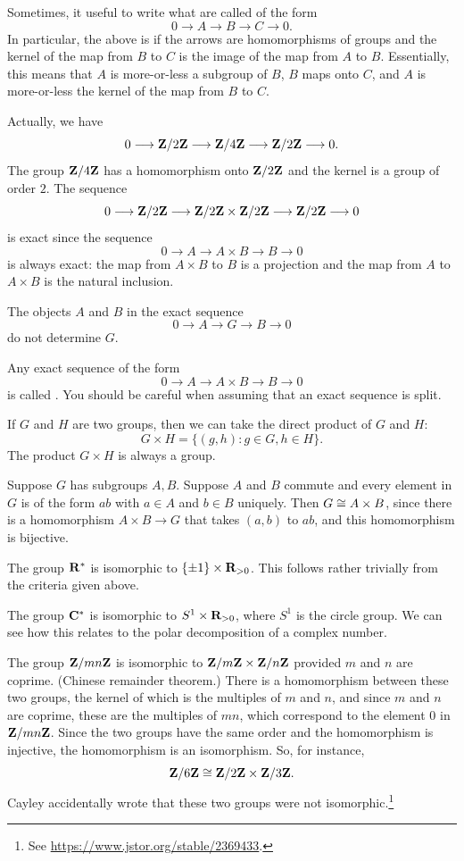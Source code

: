 \documentclass[11pt, twoside]{amsart}
\begin{document}
Sometimes, it useful to write what are called {} of the form
$$
0\longrightarrow A \longrightarrow B\longrightarrow C\longrightarrow 0.
$$
In particular, the above is  if the arrows are homomorphisms of groups and the kernel of the map from $B$ to $C$ is the image of the map from $A$ to $B$. Essentially, this means that $A$ is more-or-less a subgroup of $B$, $B$ maps onto $C$, and $A$ is more-or-less the kernel of the map from $B$ to $C$. 

Actually, we have
$$
0\longrightarrow\mathbf{Z}/2\mathbf{Z} \longrightarrow \mathbf{Z}/4\mathbf{Z} \longrightarrow \mathbf{Z}/2\mathbf{Z} \longrightarrow 0.
$$
The group $\mathbf{Z}/4\mathbf{Z}$ has a homomorphism onto $\mathbf{Z}/2\mathbf{Z}$ and the kernel is a group of order $2$. The sequence
$$
0\longrightarrow\mathbf{Z}/2\mathbf{Z} \longrightarrow \mathbf{Z}/2\mathbf{Z} \times \mathbf{Z}/2\mathbf{Z}\longrightarrow \mathbf{Z}/2\mathbf{Z} \longrightarrow 0
$$
is exact since the sequence 
$$
0\longrightarrow A\longrightarrow A\times B \longrightarrow B\longrightarrow 0
$$
is always exact: the map from $A\times B$ to $B$ is a projection and the map from $A$ to $A\times B$ is the natural inclusion.
\begin{warning}
The objects $A$ and $B$ in the exact sequence
$$
0 \longrightarrow A \longrightarrow G\longrightarrow B \longrightarrow 0
$$
do not determine $G$.
\end{warning}

Any exact sequence of the form 
$$
0\longrightarrow A\longrightarrow A\times B \longrightarrow B\longrightarrow 0
$$
is called . You should be careful when assuming that an exact sequence is split.

If $G$ and $H$ are two groups, then we can take the direct product of $G$ and $H$:
$$
G\times H = \{ (g,h) : g\in G,h\in H\}.
$$
The product $G\times H$ is always a group.

Suppose $G$ has subgroups $A,B$. Suppose $A$ and $B$ commute and every element in $G$ is of the form $ab$ with $a\in A$ and $b\in B$ uniquely. Then $G\cong A\times B$, since there is a homomorphism $A\times B\longrightarrow G$ that takes $(a,b)$ to $ab$, and this homomorphism is bijective. 

The group $\mathbf R^*$ is isomorphic to $\{\pm 1\} \times \mathbf R_{>0}$. This follows rather trivially from the criteria given above.

The group $\mathbf C^*$ is isomorphic to $S^1 \times \mathbf R_{>0}$, where $S^1$ is the circle group. We can see how this relates to the polar decomposition of a complex number.

The group $\mathbf{Z}/mn\mathbf{Z}$ is isomorphic to $\mathbf{Z}/m\mathbf{Z}\times \mathbf{Z}/n\mathbf{Z}$ provided $m$ and $n$ are coprime. ({Chinese remainder theorem}.) There is a homomorphism between these two groups, the kernel of which is the multiples of $m$ and $n$, and since $m$ and $n$ are coprime, these are the multiples of $mn$, which correspond to the element $0$ in $\mathbf{Z}/mn\mathbf{Z}$. Since the two groups have the same order and the homomorphism is injective, the homomorphism is an isomorphism. So, for instance, 
$$
\mathbf{Z}/6\mathbf{Z} \cong \mathbf{Z}/2\mathbf{Z} \times \mathbf{Z}/3\mathbf{Z}.
$$
Cayley {accidentally wrote that these two groups were not isomorphic}.\footnote{See \url{https://www.jstor.org/stable/2369433}.}
\end{document}
